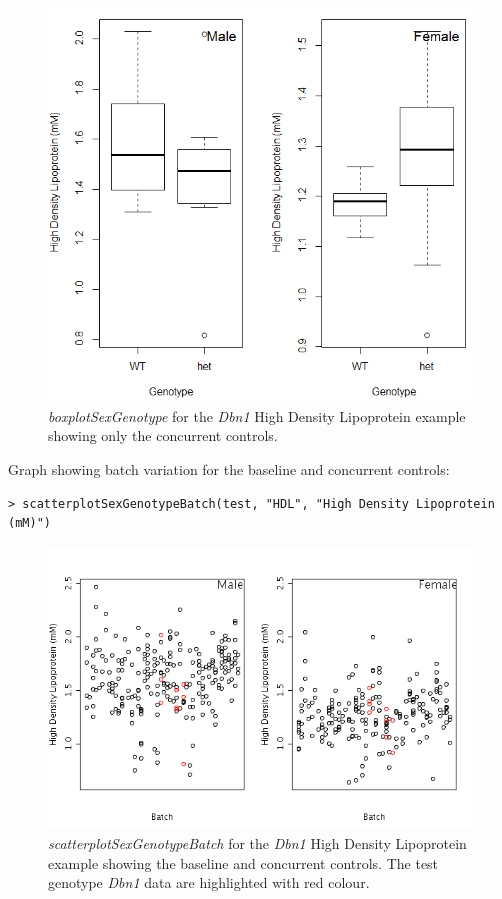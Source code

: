 \documentclass[12pt,a4paper]{article}
\begin{document}
\begin{figure}[H]%
\centerline{\includegraphics[scale=0.5]{cs_tf_2.jpg}}
\caption{\textit{boxplotSexGenotype} for the \textit{Dbn1} High Density Lipoprotein example showing only the concurrent controls.}\label{fig:cs_tf2}
\end{figure}

Graph showing batch variation for the baseline and concurrent controls:
\begingroup
\fontsize{8pt}{12pt}\selectfont
\begin{verbatim}
> scatterplotSexGenotypeBatch(test, "HDL", "High Density Lipoprotein (mM)")
\end{verbatim}
\endgroup 

\begin{figure}[H]%
\centerline{\includegraphics[scale=0.5]{cs_tf_3.png}}
\caption{\textit{scatterplotSexGenotypeBatch} for the \textit{Dbn1} High Density Lipoprotein example showing the baseline and concurrent controls. The test genotype \textit{Dbn1} data are highlighted with red colour.}\label{fig:cs_tf3}
\end{figure}
\end{document}
